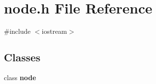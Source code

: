 \section{node.\-h \-File \-Reference}
\label{node_8h}
{\ttfamily \#include $<$iostream$>$}\*
\subsection*{\-Classes}
\begin{DoxyCompactItemize}
\item 
class {\bf node}
\end{DoxyCompactItemize}
